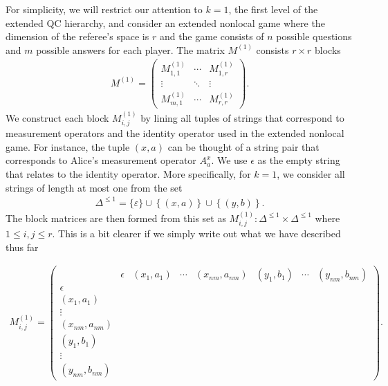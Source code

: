 For simplicity, we will restrict our attention to $k = 1$, the first level of the extended QC hierarchy, and consider an extended nonlocal game where the dimension of the referee's space is $r$ and the game consists of $n$ possible questions and $m$ possible answers for each player. The matrix $M^{(1)}$ consists $r \times r$ blocks
\begin{align}
	M^{(1)} = \begin{pmatrix}
				M_{1,1}^{(1)} & \cdots & M^{(1)}_{1,r} \\
				\vdots & \ddots & \vdots \\
				M_{m,1}^{(1)} & \cdots & M_{r,r}^{(1)}
			   \end{pmatrix}.
\end{align}
We construct each block $M_{i,j}^{(1)}$ by lining all tuples of strings that correspond to measurement operators and the identity operator used in the extended nonlocal game. For instance, the tuple $(x,a)$ can be thought of a string pair that corresponds to Alice's measurement operator $A_a^x$. We use $\epsilon$ as the empty string that relates to the identity operator. More specifically, for $k = 1$, we consider all strings of length at most one from the set
\begin{align}
	\Delta^{\leq 1} = \{\varepsilon\} \cup \left \{ (x,a) \right \} \cup \left \{ (y,b) \right \}.
\end{align}
The block matrices are then formed from this set as $M_{i,j}^{(1)} : \Delta^{\leq 1} \times \Delta^{\leq 1}$ where $1 \leq i,j \leq r$.  This is a bit clearer if we simply write out what we have described thus far 
\begin{footnotesize}
\[
\begin{aligned}
M_{i,j}^{(1)} =
\left(
\begin{array}{c||cccc|ccc}
 & \epsilon & (x_1,a_1) & \cdots & (x_{nm},a_{nm}) & (y_1,b_1) & \cdots & (y_{nm},b_{nm}) \\
\hline\hline 
\epsilon & & & & & & & \\
(x_1,a_1) & & & & & & & \\
\vdots & & & & & & & \\
(x_{nm},a_{nm}) & & & & & & & \\
\hline 
(y_1,b_1) & & & & & & & \\
\vdots & & & & & & & \\
(y_{nm},b_{nm}) & & & & & & &
\end{array}
\right). 
\end{aligned}
\]
\end{footnotesize}
